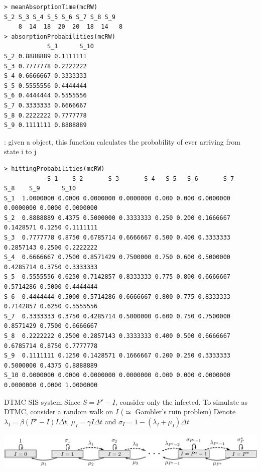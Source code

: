 \documentclass[aspectratio=43]{beamer}
\begin{document}
\begin{frame}[fragile]
\begin{lstlisting}
> meanAbsorptionTime(mcRW)
S_2 S_3 S_4 S_5 S_6 S_7 S_8 S_9 
    8  14  18  20  20  18  14   8 
> absorptionProbabilities(mcRW)
            S_1      S_10
S_2 0.8888889 0.1111111
S_3 0.7777778 0.2222222
S_4 0.6666667 0.3333333
S_5 0.5555556 0.4444444
S_6 0.4444444 0.5555556
S_7 0.3333333 0.6666667
S_8 0.2222222 0.7777778
S_9 0.1111111 0.8888889
\end{lstlisting}
\end{frame}


\begin{frame}[fragile]
: given a  object, this function calculates the probability of ever arriving from state i to j

\begin{lstlisting}
> hittingProbabilities(mcRW)
            S_1    S_2       S_3       S_4   S_5   S_6       S_7       S_8    S_9      S_10
S_1  1.0000000 0.0000 0.0000000 0.0000000 0.000 0.000 0.0000000 0.0000000 0.0000 0.0000000
S_2  0.8888889 0.4375 0.5000000 0.3333333 0.250 0.200 0.1666667 0.1428571 0.1250 0.1111111
S_3  0.7777778 0.8750 0.6785714 0.6666667 0.500 0.400 0.3333333 0.2857143 0.2500 0.2222222
S_4  0.6666667 0.7500 0.8571429 0.7500000 0.750 0.600 0.5000000 0.4285714 0.3750 0.3333333
S_5  0.5555556 0.6250 0.7142857 0.8333333 0.775 0.800 0.6666667 0.5714286 0.5000 0.4444444
S_6  0.4444444 0.5000 0.5714286 0.6666667 0.800 0.775 0.8333333 0.7142857 0.6250 0.5555556
S_7  0.3333333 0.3750 0.4285714 0.5000000 0.600 0.750 0.7500000 0.8571429 0.7500 0.6666667
S_8  0.2222222 0.2500 0.2857143 0.3333333 0.400 0.500 0.6666667 0.6785714 0.8750 0.7777778
S_9  0.1111111 0.1250 0.1428571 0.1666667 0.200 0.250 0.3333333 0.5000000 0.4375 0.8888889
S_10 0.0000000 0.0000 0.0000000 0.0000000 0.000 0.000 0.0000000 0.0000000 0.0000 1.0000000
\end{lstlisting}
\end{frame}

\begin{frame}{DTMC SIS system}
    Since $S=P^\star-I$, consider only the infected. To simulate as DTMC, consider a random walk on $I$ ($\simeq$ Gambler's ruin problem)
    \vfill
    Denote $\lambda_I = \beta (P^\star-I)I\Delta t$, $\mu_I = \gamma I\Delta t$ and $\sigma_I=1-(\lambda_I+\mu_I)\Delta t$
    \vfill
    \begin{center}
        \includegraphics[width=\textwidth]{FIGS/figure_SIS_random_walk.png}
    \end{center}
\end{frame}
\end{document}
